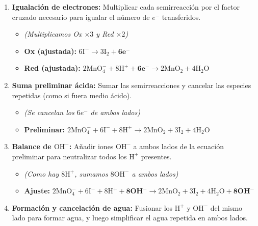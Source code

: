 \documentclass[letterpaper, 12pt, twoside]{article}
\newenvironment{formulabox}[1]{%
    \begin{tcolorbox}[colback=rojoSuave, colframe=rojoFuerte,
        title=\textbf{#1}, fonttitle=\bfseries]
}{%
    \end{tcolorbox}
}
\begin{document}
\begin{formulabox}{Pasos — Medio Básico}
\begin{enumerate}[leftmargin=15pt, itemsep=0.3em]
\begin{itemize}[leftmargin=15pt, topsep=2pt, itemsep=0pt]
        \item \textbf{Red:} $\text{MnO}_4^- + 4\text{H}^+ + \mathbf{3e^-} \rightarrow \text{MnO}_2 + 2\text{H}_2\text{O}$
    \end{itemize}
\vspace{0.2cm}
    \item \textbf{Igualación de electrones:} Multiplicar cada semirreacción por el factor cruzado necesario para igualar el número de $e^-$ transferidos.
    \begin{itemize}[leftmargin=15pt, topsep=2pt, itemsep=0pt]
        \item \textit{(Multiplicamos Ox $\times 3$ y Red $\times 2$)}
        \item \textbf{Ox (ajustada):} $6\text{I}^- \rightarrow 3\text{I}_2 + \mathbf{6e^-}$
        \item \textbf{Red (ajustada):} $2\text{MnO}_4^- + 8\text{H}^+ + \mathbf{6e^-} \rightarrow 2\text{MnO}_2 + 4\text{H}_2\text{O}$
    \end{itemize}
\vspace{0.1cm}
    \item \textbf{Suma preliminar ácida:} Sumar las semirreacciones y cancelar las especies repetidas (como si fuera medio ácido).
    \begin{itemize}[leftmargin=15pt, topsep=2pt, itemsep=0pt]
        \item \textit{(Se cancelan los $6e^-$ de ambos lados)}
        \item \textbf{Preliminar:} $2\text{MnO}_4^- + 6\text{I}^- + 8\text{H}^+ \rightarrow 2\text{MnO}_2 + 3\text{I}_2 + 4\text{H}_2\text{O}$
    \end{itemize}
\vspace{0.1cm}
    \item \textbf{Balance de $\text{OH}^-$:} Añadir iones $\text{OH}^-$ a ambos lados de la ecuación preliminar para neutralizar todos los $\text{H}^+$ presentes.
    \begin{itemize}[leftmargin=15pt, topsep=2pt, itemsep=0pt]
        \item \textit{(Como hay $8\text{H}^+$, sumamos $8\text{OH}^-$ a ambos lados)}
        \item \textbf{Ajuste:} $2\text{MnO}_4^- + 6\text{I}^- + 8\text{H}^+ + \mathbf{8OH^-} \rightarrow 2\text{MnO}_2 + 3\text{I}_2 + 4\text{H}_2\text{O} + \mathbf{8OH^-}$
    \end{itemize}
\vspace{0.1cm}
    \item \textbf{Formación y cancelación de agua:} Fusionar los $\text{H}^+$ y $\text{OH}^-$ del mismo lado para formar agua, y luego simplificar el agua repetida en ambos lados.

\end{enumerate}
\end{formulabox}
\end{document}
